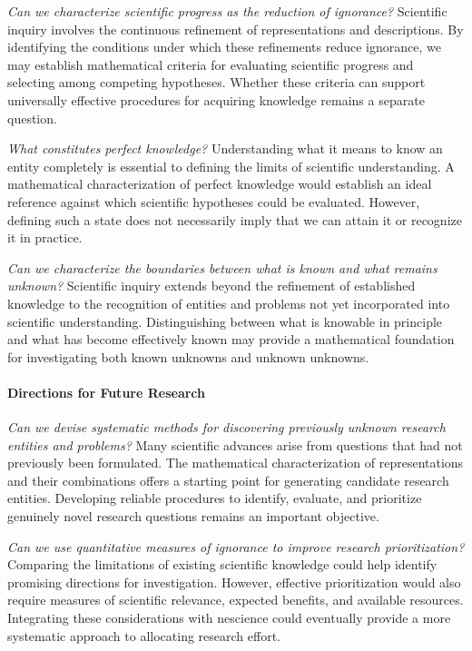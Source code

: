 \emph{Can we characterize scientific progress as the reduction of ignorance?} Scientific inquiry involves the continuous refinement of representations and descriptions. By identifying the conditions under which these refinements reduce ignorance, we may establish mathematical criteria for evaluating scientific progress and selecting among competing hypotheses. Whether these criteria can support universally effective procedures for acquiring knowledge remains a separate question.

\emph{What constitutes perfect knowledge?} Understanding what it means to know an entity completely is essential to defining the limits of scientific understanding. A mathematical characterization of perfect knowledge would establish an ideal reference against which scientific hypotheses could be evaluated. However, defining such a state does not necessarily imply that we can attain it or recognize it in practice.

\emph{Can we characterize the boundaries between what is known and what remains unknown?} Scientific inquiry extends beyond the refinement of established knowledge to the recognition of entities and problems not yet incorporated into scientific understanding. Distinguishing between what is knowable in principle and what has become effectively known may provide a mathematical foundation for investigating both known unknowns and unknown unknowns.

\paragraph{Directions for Future Research}

\emph{Can we devise systematic methods for discovering previously unknown research entities and problems?} Many scientific advances arise from questions that had not previously been formulated. The mathematical characterization of representations and their combinations offers a starting point for generating candidate research entities. Developing reliable procedures to identify, evaluate, and prioritize genuinely novel research questions remains an important objective.

\emph{Can we use quantitative measures of ignorance to improve research prioritization?} Comparing the limitations of existing scientific knowledge could help identify promising directions for investigation. However, effective prioritization would also require measures of scientific relevance, expected benefits, and available resources. Integrating these considerations with nescience could eventually provide a more systematic approach to allocating research effort.

